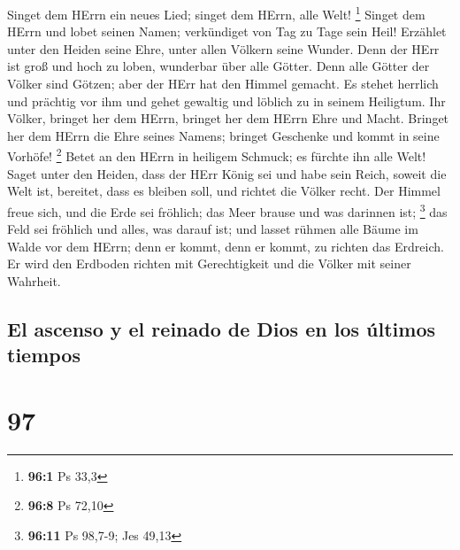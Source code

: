  Singet dem HErrn ein neues Lied; singet dem HErrn, alle
Welt! \footnote{\textbf{96:1} Ps 33,3}  Singet dem HErrn
und lobet seinen Namen; verkündiget von Tag zu Tage sein Heil!
 Erzählet unter den Heiden seine Ehre, unter allen Völkern
seine Wunder.  Denn der HErr ist groß und hoch zu loben,
wunderbar über alle Götter.  Denn alle Götter der Völker
sind Götzen; aber der HErr hat den Himmel gemacht.  Es
stehet herrlich und prächtig vor ihm und gehet gewaltig und löblich zu
in seinem Heiligtum.  Ihr Völker, bringet her dem HErrn,
bringet her dem HErrn Ehre und Macht.  Bringet her dem
HErrn die Ehre seines Namens; bringet Geschenke und kommt in seine
Vorhöfe! \footnote{\textbf{96:8} Ps 72,10}  Betet an den
HErrn in heiligem Schmuck; es fürchte ihn alle Welt! 
Saget unter den Heiden, dass der HErr König sei und habe sein Reich,
soweit die Welt ist, bereitet, dass es bleiben soll, und richtet die
Völker recht.  Der Himmel freue sich, und die Erde sei
fröhlich; das Meer brause und was darinnen ist; \footnote{\textbf{96:11}
  Ps 98,7-9; Jes 49,13}  das Feld sei fröhlich und alles,
was darauf ist; und lasset rühmen alle Bäume im Walde 
vor dem HErrn; denn er kommt, denn er kommt, zu richten das Erdreich. Er
wird den Erdboden richten mit Gerechtigkeit und die Völker mit seiner
Wahrheit.

\hypertarget{el-ascenso-y-el-reinado-de-dios-en-los-uxfaltimos-tiempos}{%
\subsection{El ascenso y el reinado de Dios en los últimos
tiempos}\label{el-ascenso-y-el-reinado-de-dios-en-los-uxfaltimos-tiempos}}

\hypertarget{section-96}{%
\section{97}\label{section-96}}

